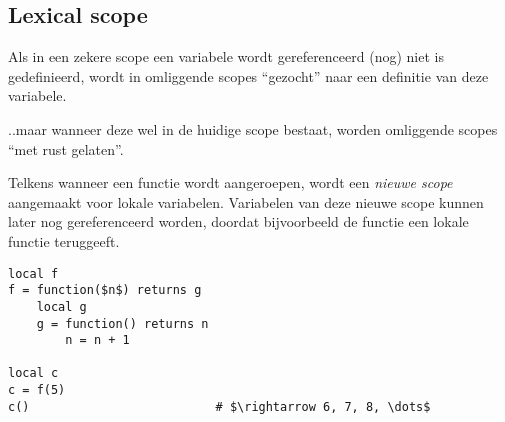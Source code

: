 \newCodeFragment
{}

\subsection{Lexical scope}

Als in een zekere scope een variabele wordt gereferenceerd (nog) niet is gedefinieerd, wordt in omliggende scopes ``gezocht'' naar een definitie van deze variabele.



..maar wanneer deze wel in de huidige scope bestaat, worden omliggende scopes ``met rust gelaten''.

\newCodeFragment


Telkens wanneer een functie wordt aangeroepen, wordt een \emph{nieuwe scope} aangemaakt voor lokale variabelen. Variabelen van deze nieuwe scope kunnen later nog gereferenceerd worden, doordat bijvoorbeeld de functie een lokale functie teruggeeft.

\newCodeFragment


\begin{lstlisting}[caption=Een countervoorbeeld,label=exa:counter]
local f
f = function($n$) returns g
    local g
    g = function() returns n
        n = n + 1

local c
c = f(5)
c()                          # $\rightarrow 6, 7, 8, \dots$
\end{lstlisting}

